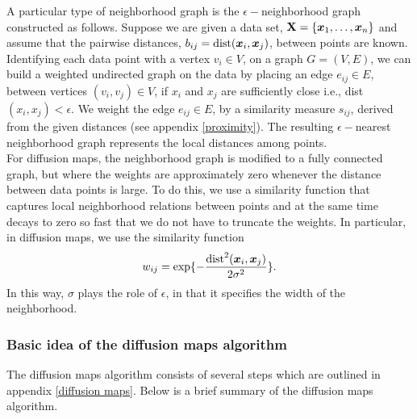 A particular type of neighborhood graph is the $\epsilon-$neighborhood graph constructed as follows. Suppose we are given a data set, $\textbf{X} =  \{\boldsymbol{x}_{1}, \ldots, \boldsymbol{x}_{n} \}$ and assume that the pairwise distances, $b_{ij} = \text{dist}(\boldsymbol{x}_{i}, \boldsymbol{x}_{j})$, between points are known. Identifying each data point with a vertex $v_{i} \in V$, on a graph $G = (V, E)$, we can build a weighted  undirected graph on the data by placing an edge $e_{ij} \in E$, between vertices $(v_i, v_j) \in V$, if $x_i$ and $x_j$ are sufficiently close i.e., dist$(x_i, x_j) < \epsilon$. We weight the edge $e_{ij} \in E$, by a similarity measure $s_{ij}$, derived from the given distances (see appendix \ref{proximity}). The resulting $\epsilon-$nearest neighborhood graph represents the local distances among points.\\

For diffusion maps, the neighborhood graph is modified to a fully connected graph, but where the weights are approximately zero whenever the distance between data points is large.
To do this, we use a similarity function that captures local neighborhood relations between points and at the same time decays to zero so fast that we do not have to truncate the weights. In particular, in diffusion maps, we use the similarity function 
$$w_{ij} = \exp \{- \frac{\text{dist}^{2}(\boldsymbol{x}_i, \boldsymbol{x}_j)}{2 \sigma^2} \}.$$ 
In this way, $\sigma$ plays the role of $\epsilon$, in that it specifies the width of the neighborhood.

\subsubsection{Basic idea of the diffusion maps algorithm}
The diffusion maps algorithm consists of several steps which are outlined in appendix \ref{diffusion maps}. Below is a brief summary of the diffusion maps algorithm.

